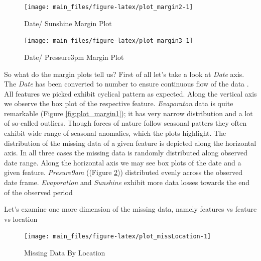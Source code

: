\begin{Schunk}
\begin{figure}[H]

{\centering \texttt{[image: main\_files/figure-latex/plot\_margin2-1]} 

}

\caption[Date/ Sunshine Margin Plot]{Date/ Sunshine Margin Plot}\label{fig:plot_margin2}
\end{figure}
\end{Schunk}

\begin{Schunk}
\begin{figure}[H]

{\centering \texttt{[image: main\_files/figure-latex/plot\_margin3-1]} 

}

\caption[Date/ Pressure3pm Margin Plot]{Date/ Pressure3pm Margin Plot}\label{fig:plot_margin3}
\end{figure}
\end{Schunk}

So what do the margin plots tell us? First of all let's take a look at
\emph{Date} axis. The \emph{Date} has been converted to number to ensure
continuous flow of the data . All features we picked exhibit cyclical
pattern as expected. Along the vertical axis we observe the box plot of
the respective feature. \emph{Evaporaton} data is quite remarkable
(Figure \ref{fig:plot_margin1}); it has very narrow distribution and a
lot of so-called outliers. Though forces of nature follow seasonal
patters they often exhibit wide range of seasonal anomalies, which the
plots highlight. The distribution of the missing data of a given feature
is depicted along the horizontal axis. In all three cases the missing
data is randomly distributed along observed date range. Along the
horizontal axis we may see box plots of the date and a given feature.
\emph{Presure9am} ((Figure \ref{fig:plot_margin3})) distributed evenly
across the observed date frame. \emph{Evaporation} and \emph{Sunshine}
exhibit more data losses towards the end of the observed period

Let's examine one more dimension of the missing data, namely features vs
feature vs location

\begin{Schunk}
\begin{figure}[H]

{\centering \texttt{[image: main\_files/figure-latex/plot\_missLocation-1]} 

}

\caption[Missing Data By Location]{Missing Data By Location}\label{fig:plot_missLocation}
\end{figure}
\end{Schunk}

